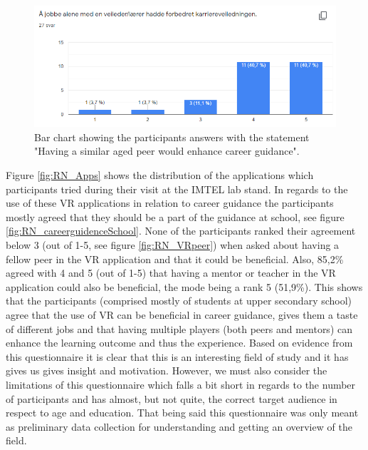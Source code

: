 \begin{figure}[!ht]
    \centering
    \captionsetup{width=.7\linewidth}
    \includegraphics[width=.8\textwidth]{./fig/phase_1/researcherNight/RN_careerguidenceMentor.PNG}
    \caption{Bar chart showing the participants answers with the statement "Having a similar aged peer would enhance career guidance".}
    \label{fig:phase1RNPeer}
\end{figure}

Figure \ref{fig:RN_Apps} shows the distribution of the applications which participants tried during their visit at the IMTEL lab stand.  In regards to the use of these VR applications in relation to career guidance the participants mostly agreed that they should be a part of the guidance at school, see figure \ref{fig:RN_careerguidenceSchool}. None of the participants ranked their agreement below 3 (out of 1-5, see figure \ref{fig:RN_VRpeer}) when asked about having a fellow peer in the VR application and that it could be beneficial. Also, 85,2\% agreed with 4 and 5 (out of 1-5) that having a mentor or teacher in the VR application could also be beneficial, the mode being a rank 5 (51,9\%).
This shows that the participants (comprised mostly of students at upper secondary school) agree that the use of VR can be beneficial in career guidance, gives them a taste of different jobs and that having multiple  players (both peers and mentors) can enhance the learning outcome and thus the experience. Based on evidence from this questionnaire it is clear that this is an interesting field of study and it has gives us gives insight and motivation. However, we must also consider the limitations of this questionnaire which falls a bit short in regards to the number of participants and has almost, but not quite, the correct target audience in respect to age and education. That being said this questionnaire was only meant as preliminary data collection for understanding and getting an overview of the field.          

